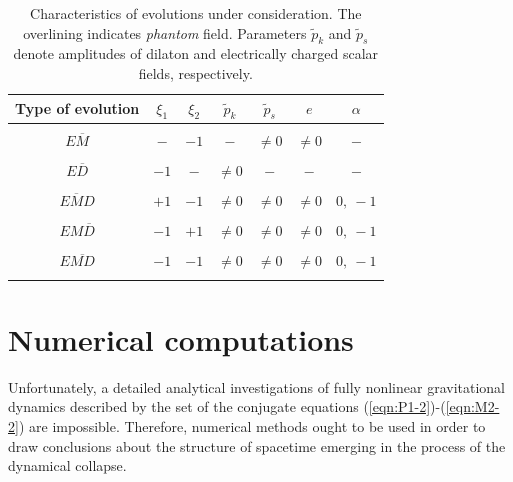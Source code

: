 \documentclass[aps,showpacs,nofootinbib,floatfix]{revtex4}
\newcommand{\tpe}{{\tilde p}}
\begin{document}
\begin{table}
\caption{Characteristics of evolutions under consideration. The overlining indicates {\it phantom} field. Parameters $\tpe_k$ and $\tpe_s$ denote amplitudes of dilaton and electrically charged scalar fields, respectively.}
\begin{ruledtabular}
\begin{tabular}{c|c|c|c|c|c|c}
Type of evolution & $\xi_1$ & $\xi_2$ & $\tpe_k$ & $\tpe_s$ & $e$ & $\alpha$\\
\hline
& & & & & &\\
$E\overline{M}$ & $-$ & $-1$ & $-$ & $\neq 0$ & $\neq 0$ & $-$\\
& & & & & &\\
$E\overline{D}$ & $-1$ & $-$ & $\neq 0$ & $-$ & $-$ & $-$\\
& & & & & &\\
$E\overline{M}D$ & $+1$ & $-1$ & $\neq 0$ & $\neq 0$ & $\neq 0$ & $0,\: - 1$\\
& & & & & &\\
$EM\overline{D}$ & $-1$ & $+1$ & $\neq 0$ & $\neq 0$ & $\neq 0$ & $0,\: - 1$\\
& & & & & &\\
$E\overline{MD}$ & $-1$ & $-1$ & $\neq 0$ & $\neq 0$ & $\neq 0$ & $0,\: - 1$\\
& & & & & &\\
\end{tabular}
\end{ruledtabular}
\label{tab:evolutions-characteristics}
\end{table}







\section{Numerical computations}
Unfortunately, a detailed analytical investigations of fully nonlinear gravitational dynamics described by
the set of the conjugate equations (\ref{eqn:P1-2})-(\ref{eqn:M2-2}) 
are impossible. Therefore, numerical methods ought to be used in 
order to draw conclusions about the structure of spacetime emerging in the process of
the dynamical collapse.
\end{document}
